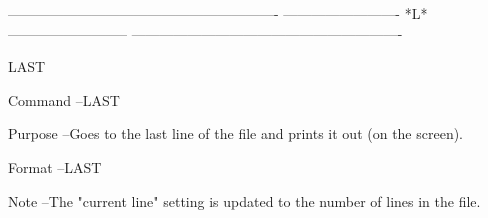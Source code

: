  
 
 
 
 
 
 
 
 
 
 
 
 
 
 
 
 
 
 
 
 
 
 
 
 
 
 
 
 
 
 
 
 
 
 
 
 
 
 
 
 
 
 
 
 
 
 
 
 
 
 
 
 
 
 
 
 
 
 
 
 
 
 
 
 
 
 
 
 
 
 
 
 
 
 
 
 
 
 
 
 
 
 
 
 
 
 
 
 
 
 
 
----------------------------------------------------------
-------------------------  *L*  --------------------------
----------------------------------------------------------
 
LAST
 
Command --LAST
 
Purpose --Goes to the last line of the file
          and prints it out (on the screen).
 
Format  --LAST
 
Note    --The "current line" setting is updated
          to the     number of lines     in the file.
 
